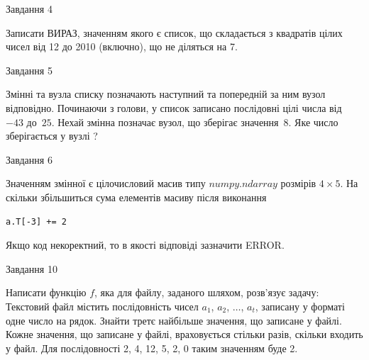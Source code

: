 \documentclass[12pt, ukrainian]{article}
\begin{document}
{\begin{minipage}[t]{8.0cm}
\end{minipage}


               
{\begin{center}Завдання {4}\end{center}}
\vspace{-4mm}

Записати ВИРАЗ, значенням якого є список, що складається з квадратів цілих чисел від 12 до 2010 (включно), що не діляться на 7.\par

\vspace{10mm}
               
{\begin{center}Завдання {5}\end{center}}
\vspace{-4mm}
Змінні  та  вузла списку позначають наступний та попередній за ним вузол відповідно. Починаючи з голови, у список записано послідовні цілі числа від~$-43$ до~$25$. Нехай змінна  позначає вузол, що зберігає значення~$8$.
Яке число зберігається у вузлі  ?\par

               
{\begin{center}Завдання {6}\end{center}}
\vspace{-4mm}
Значенням змінної  є цілочисловий масив типу $numpy.ndarray$ розмірів $4{\times}5$. На скільки збільшиться сума елементів масиву  після виконання
\begin{verbatim}
a.T[-3] += 2
\end{verbatim}


Якщо код некоректний, то в якості відповіді зазначити ERROR.\par

               
{\begin{center}Завдання {10}\end{center}}
\vspace{-4mm}

Написати функцію $f$, яка для файлу, заданого шляхом, розв’язує задачу:\\ Текстовий файл містить послідовність чисел $a_1$, $a_2$, $\ldots$, $a_t$, записану у форматі одне число на рядок. Знайти третє найбільше значення, що записане у файлі. Кожне значення, що записане у файлі, враховується стільки разів, скільки входить у файл. Для послідовності 2, 4, 12, 5, 2, 0 таким значенням буде 2.

}
\end{document}
